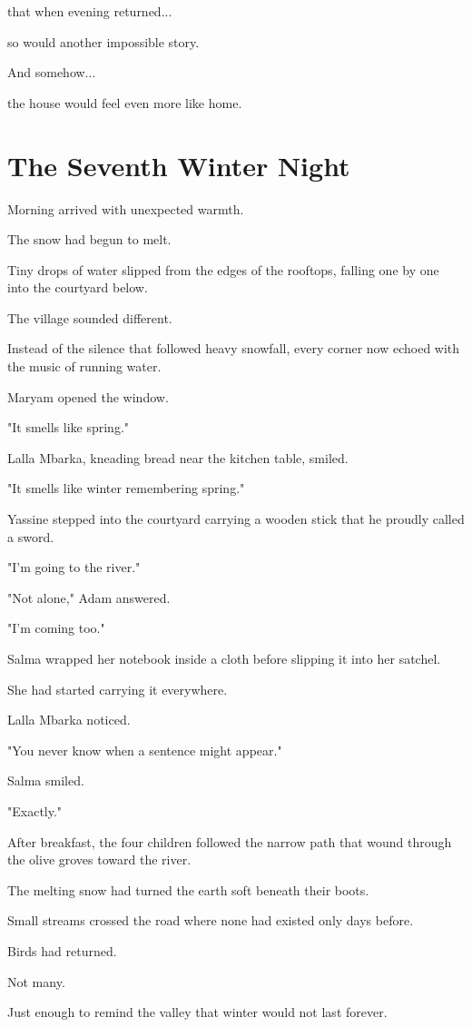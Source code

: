 \documentclass[12pt,openany]{book}
\begin{document}
that when evening returned...

so would another impossible story.

And somehow...

the house would feel even more like home.
\chapter{The Seventh Winter Night}

Morning arrived with unexpected warmth.

The snow had begun to melt.

Tiny drops of water slipped from the edges of the rooftops, falling one by one into the courtyard below.

The village sounded different.

Instead of the silence that followed heavy snowfall, every corner now echoed with the music of running water.

Maryam opened the window.

"It smells like spring."

Lalla Mbarka, kneading bread near the kitchen table, smiled.

"It smells like winter remembering spring."

Yassine stepped into the courtyard carrying a wooden stick that he proudly called a sword.

"I'm going to the river."

"Not alone," Adam answered.

"I'm coming too."

Salma wrapped her notebook inside a cloth before slipping it into her satchel.

She had started carrying it everywhere.

Lalla Mbarka noticed.

"You never know when a sentence might appear."

Salma smiled.

"Exactly."

After breakfast, the four children followed the narrow path that wound through the olive groves toward the river.

The melting snow had turned the earth soft beneath their boots.

Small streams crossed the road where none had existed only days before.

Birds had returned.

Not many.

Just enough to remind the valley that winter would not last forever.
\end{document}
